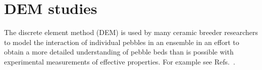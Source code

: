 \chapter{DEM studies}\label{sec:dem-studies}
The discrete element method (DEM) is used by many ceramic breeder researchers to model the interaction of individual pebbles in an ensemble in an effort to obtain a more detailed understanding of pebble beds than is possible with experimental measurements of effective properties. For example see Refs.~\cite{An20071393, Lu2000, Zhao2010, Gan2010a, Annabattula2012a, VanLew2014}.



